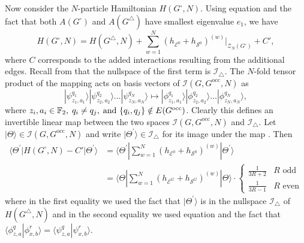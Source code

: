 \documentclass[../thesis-main/thesis-main]{subfiles}
\begin{document}
Now consider the $N$-particle Hamiltonian $H(G^{\square},N)$. Using equation  and the fact that both $A(G^{\square})$ and $A(G^{\triangle})$ have smallest eigenvalue $e_{1}$, we have
\begin{equation}
  H(G^{\square},N)=H(G^{\triangle},N)+\sum_{w=1}^{N}\left(h_{\mathcal{E}^{0}}+h_{\mathcal{S}^{0}}\right)^{(w)}\bigg|_{\mathcal{Z}_{N}(G^{\square})} + C',
\end{equation}
where $C$ corresponds to the added interactions resulting from the additional edges. Recall from  that the nullspace of the first term is $\mathcal{I}_{\triangle}$. The $N$-fold tensor product of the mapping  acts on basis vectors of $\mathcal{I}(G,G^{\text{occ}},N)$ as 
\begin{equation}
  |\psi_{z_{1},a_{1}}^{q_{1}}\rangle|\psi_{z_{2},a_{2}}^{q_{2}}\rangle\ldots|\psi_{z_{N},a_{N}}^{q_{N}}\rangle
    \mapsto
  |\phi_{z_{1},a_{1}}^{q_{1}}\rangle|\phi_{z_{2},a_{2}}^{q_{2}}\rangle\ldots|\phi_{z_{N},a_{N}}^{q_{N}}\rangle,
  \label{eq:N_particle_mapping}
\end{equation}
where $z_{i},a_{i}\in\mathbb{F}_2,\; q_{i}\neq q_{j},\;\text{and }\{q_{i},q_{j}\}\notin E(G^{\text{occ}})$.
Clearly this defines an invertible linear map between the two spaces
$\mathcal{I}(G,G^{\text{occ}},N)$ and $\mathcal{I}_{\triangle}$. Let $|\Theta\rangle\in\mathcal{I}(G,G^{\text{occ}},N)$
and write $|\Theta^{\prime}\rangle\in\mathcal{I}_{\triangle}$ for its image under the map . Then 
\begin{align}
  \langle\Theta^{\prime}|H(G^{\square},N)-C'|\Theta^{\prime}\rangle&=\langle\Theta^{\prime}|\sum_{w=1}^{N}\left(h_{\mathcal{E}^{0}}+h_{\mathcal{S}^{0}}\right)^{(w)}|\Theta^{\prime}\rangle\\
  &=\langle\Theta|\sum_{w=1}^{N}\left(h_{\mathcal{E}^{G}}+h_{\mathcal{S}^{G}}\right)^{(w)}|\Theta\rangle\cdot
  \begin{cases}
    \frac{1}{3R+2} & R\text{ odd}\\
    \frac{1}{3R-1} & R\text{ even}
  \end{cases}
\label{eq:Theta_Theta_prime_eqn}
\end{align}
where in the first equality we used the fact that $|\Theta^\prime\rangle$ is in the nullspace $\mathcal{I}_{\triangle}$ of $H(G^\triangle,N)$ and in the second equality we used equation  and the fact that $\langle\phi_{z,a}^{q}|\phi_{x,b}^{r}\rangle=\langle\psi_{z,a}^{q}|\psi_{x,b}^{r}\rangle$. 
\end{document}
